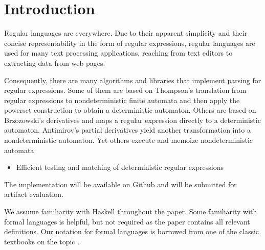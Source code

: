 \section{Introduction}

Regular languages are everywhere. Due to their apparent simplicity and
their concise representability in the form of regular expressions,
regular languages are used for many text processing
applications, reaching from text editors
\cite{DBLP:journals/cacm/Thompson68} to extracting data from web
pages.

Consequently, there are many algorithms and libraries that implement
parsing for regular expressions. Some of them are based on Thompson's
translation from regular expressions to nondeterministic finite
automata and then apply the powerset construction to obtain a
deterministic automaton. Others are based on Brzozowski's derivatives
\cite{Brzozowski1964} and
maps a regular expression directly to a deterministic
automaton. Antimirov's partial derivatives \cite{Antimirov96Partial}
yield another transformation into a nondeterministic automaton.
Yet others execute and memoize nondeterministic automata 

\begin{itemize}
\item Efficient testing and matching of deterministic regular
  expressions \cite{DBLP:journals/jcss/GrozM17}
\end{itemize}
\TODO{}

The implementation will be available on Github and will be submitted for artifact evaluation. 


We assume familiarity with Haskell throughout the paper.  Some
familiarity with formal languages is helpful, but not required as the
paper contains all relevant definitions. Our notation for formal
languages is borrowed from one of the classic textbooks on the topic
\cite{DBLP:books/daglib/0011126}.

